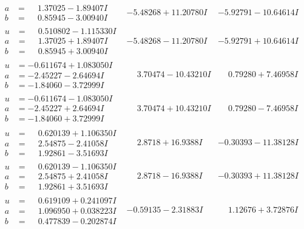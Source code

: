 \documentclass[1p]{elsarticle_modified}
\theoremstyle{definition}
\begin{document}
$$\begin{array}{c|c|c}
\begin{aligned}
a &= \phantom{-}1.37025 - 1.89407 I \\
b &= \phantom{-}0.85945 - 3.00940 I\end{aligned}
 & -5.48268 + 11.20780 I & -5.92791 - 10.64614 I \\ \hline\begin{aligned}
u &= \phantom{-}0.510802 - 1.115330 I \\
a &= \phantom{-}1.37025 + 1.89407 I \\
b &= \phantom{-}0.85945 + 3.00940 I\end{aligned}
 & -5.48268 - 11.20780 I & -5.92791 + 10.64614 I \\ \hline\begin{aligned}
u &= -0.611674 + 1.083050 I \\
a &= -2.45227 - 2.64694 I \\
b &= -1.84060 - 3.72999 I\end{aligned}
 & \phantom{-}3.70474 - 10.43210 I & \phantom{-}0.79280 + 7.46958 I \\ \hline\begin{aligned}
u &= -0.611674 - 1.083050 I \\
a &= -2.45227 + 2.64694 I \\
b &= -1.84060 + 3.72999 I\end{aligned}
 & \phantom{-}3.70474 + 10.43210 I & \phantom{-}0.79280 - 7.46958 I \\ \hline\begin{aligned}
u &= \phantom{-}0.620139 + 1.106350 I \\
a &= \phantom{-}2.54875 - 2.41058 I \\
b &= \phantom{-}1.92861 - 3.51693 I\end{aligned}
 & \phantom{-}2.8718 + 16.9388 I & -0.30393 - 11.38128 I \\ \hline\begin{aligned}
u &= \phantom{-}0.620139 - 1.106350 I \\
a &= \phantom{-}2.54875 + 2.41058 I \\
b &= \phantom{-}1.92861 + 3.51693 I\end{aligned}
 & \phantom{-}2.8718 - 16.9388 I & -0.30393 + 11.38128 I \\ \hline\begin{aligned}
u &= \phantom{-}0.619109 + 0.241097 I \\
a &= \phantom{-}1.096950 + 0.038223 I \\
b &= \phantom{-}0.477839 - 0.202874 I\end{aligned}
 & -0.59135 - 2.31883 I & \phantom{-}1.12676 + 3.72876 I \\ \hline\begin{aligned}

\end{aligned}
\end{array}$$
\end{document}
